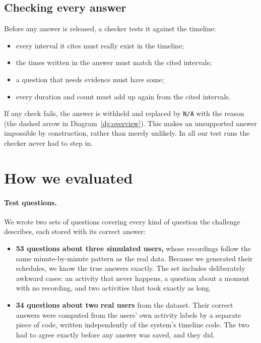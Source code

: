 \documentclass[11pt,a4paper]{article}
\newcommand{\code}[1]{\texttt{#1}}
\begin{document}
\subsection{Checking every answer}
Before any answer is released, a checker tests it against the timeline:
\begin{itemize}
  \item every interval it cites must really exist in the timeline;
  \item the times written in the answer must match the cited intervals;
  \item a question that needs evidence must have some;
  \item every duration and count must add up again from the cited intervals.
\end{itemize}
If any check fails, the answer is withheld and replaced by \code{N/A} with the reason (the dashed arrow in Diagram~\ref{dg:overview}). This makes an unsupported answer impossible by construction, rather than merely unlikely. In all our test runs the checker never had to step in.

\section{How we evaluated}
\label{sec:eval}

\paragraph{Test questions.} We wrote two sets of questions covering every kind of question the challenge describes, each stored with its correct answer:
\begin{itemize}
  \item \textbf{53 questions about three simulated users,} whose recordings follow the same minute-by-minute pattern as the real data. Because we generated their schedules, we know the true answers exactly. The set includes deliberately awkward cases: an activity that never happens, a question about a moment with no recording, and two activities that took exactly as long.
  \item \textbf{34 questions about two real users} from the dataset. Their correct answers were computed from the users' own activity labels by a separate piece of code, written independently of the system's timeline code. The two had to agree exactly before any answer was saved, and they did.
\end{itemize}
\end{document}
